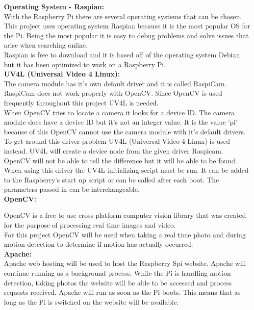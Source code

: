 \documentclass[]{report}
\begin{document}
\noindent
{\bf Operating System - Raspian:}\\
\break
With the Raspberry Pi there are several operating systems that can be chosen. This project uses operating system Raspian because it is the most popular OS for the Pi. Being the most popular it is easy to debug problems and solve issues that arise when searching online.\\

Raspian is free to download and it is based off of the operating system Debian but it has been optimized to work on a Raspberry Pi. \\ 

\noindent
{\bf UV4L (Universal Video 4 Linux):}\\
\break
The camera module has it's own default driver and it is called RaspiCam. RaspiCam does not work properly with OpenCV. Since OpenCV is used frequently throughout this project UV4L is needed.\\

When OpenCV tries to locate a camera it looks for a device ID. The camera module does have a device ID but it's not an integer value. It is the value 'pi' because of this OpenCV cannot use the camera module with it's default drivers. To get around this driver problem UV4L (Universal Video 4 Linux) is used instead. UV4L will create a device node from the given driver Raspicam. OpenCV will not be able to tell the difference but it will be able to be found.\\

When using this driver the UV4L initializing script must be run. It can be added to the Raspberry's start up script or can be called after each boot. The parameters passed in can be interchangeable. \\

\noindent
{\bf OpenCV:}\\
\break

OpenCV is a free to use cross platform computer vision library that was created for the purpose of processing real time images and video.\\

For this project OpenCV will be used when taking a real time photo and during motion detection to determine if motion has actually occurred.\\

\noindent
{\bf Apache:}\\
\break
Apache web hosting will be used to host the Raspberry Spi website. Apache will continue running as a background process. While the Pi is handling motion detection, taking photos the website will be able to be accessed and process requests received. Apache will run as soon as the Pi boots. This means that as long as the Pi is switched on the website will be available.\\ 
\end{document}
